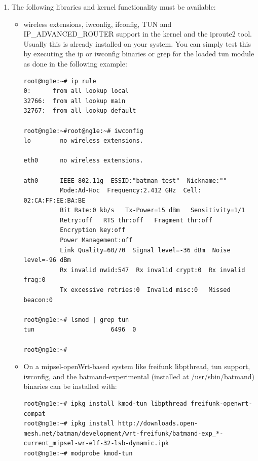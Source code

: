 \documentclass[11pt]{article}
\begin{document}
\begin{enumerate}

\item The following libraries and kernel functionality must be available:

\begin{itemize}
 \item wireless extensions, iwconfig, ifconfig, TUN and IP\_ADVANCED\_ROUTER support in the kernel and the iproute2 tool. Usually this is already installed on your system. You can simply test this by executing the ip or iwconfig binaries or grep for the loaded tun module as done in the following example:
%
\begin{small} \begin{verbatim}
root@ng1e:~# ip rule
0:      from all lookup local
32766:  from all lookup main
32767:  from all lookup default

root@ng1e:~#root@ng1e:~# iwconfig
lo        no wireless extensions.

eth0      no wireless extensions.

ath0      IEEE 802.11g  ESSID:"batman-test"  Nickname:""
          Mode:Ad-Hoc  Frequency:2.412 GHz  Cell: 02:CA:FF:EE:BA:BE
          Bit Rate:0 kb/s   Tx-Power=15 dBm   Sensitivity=1/1
          Retry:off   RTS thr:off   Fragment thr:off
          Encryption key:off
          Power Management:off
          Link Quality=60/70  Signal level=-36 dBm  Noise level=-96 dBm
          Rx invalid nwid:547  Rx invalid crypt:0  Rx invalid frag:0
          Tx excessive retries:0  Invalid misc:0   Missed beacon:0

root@ng1e:~# lsmod | grep tun
tun                     6496  0

root@ng1e:~#
\end{verbatim} \end{small} 

\item On a mipsel-openWrt-based system like freifunk libpthread, tun support, iwconfig, and the batmand-experimental (installed at /usr/sbin/batmand) binaries can be installed with:
%
\begin{tiny}  \begin{verbatim}
root@ng1e:~# ipkg install kmod-tun libpthread freifunk-openwrt-compat
root@ng1e:~# ipkg install http://downloads.open-mesh.net/batman/development/wrt-freifunk/batmand-exp_*-current_mipsel-wr-elf-32-lsb-dynamic.ipk
root@ng1e:~# modprobe kmod-tun
\end{verbatim} \end{tiny} 


\end{itemize}
\end{enumerate}
\end{document}
